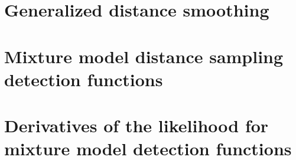 \documentclass[mitthesis]{report}
\begin{document}
\chapter{Generalized distance smoothing}



\chapter{Mixture model distance sampling detection functions}



\appendix
\chapter{Derivatives of the likelihood for mixture model detection functions}






\end{document}
